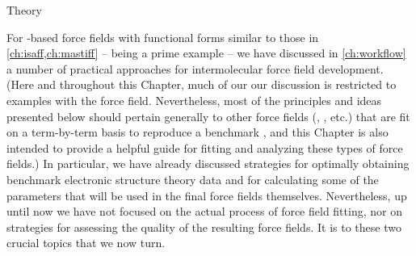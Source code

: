 \begin{subsection}{Theory}

For \sapt-based force fields with functional forms similar to those in
\cref{ch:isaff,ch:mastiff} -- \mastiff being a prime example -- 
we have discussed in \cref{ch:workflow} a number of practical approaches for
intermolecular force field development.
(Here and throughout this Chapter, much of our
our discussion is restricted to examples with the \mastiff force field. Nevertheless, most
of the principles and ideas presented below should pertain generally to other
force fields (\saptff, \isaffold, etc.) that are fit on a term-by-term basis
to reproduce a benchmark \eda, and this Chapter is also intended to provide a
helpful guide for fitting and analyzing these types of force fields.)
In particular, we have already discussed strategies for optimally obtaining benchmark
electronic structure theory data and for calculating some of the parameters
that will be used in the final force fields themselves. Nevertheless, up
until now we have not focused on the actual process of force field fitting, nor on
strategies for assessing the quality of the resulting force fields. It is
to these two crucial topics that we now turn.

\newcommand{\bij}{\textcolor{black}{B_{ij}}}
\newcommand{\bijr}{\bij r}


\end{subsection}
